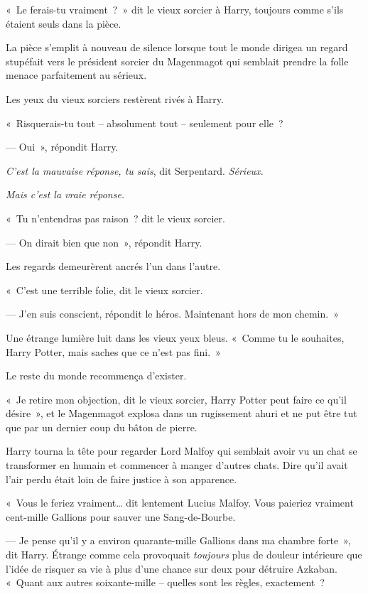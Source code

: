 «~Le ferais-tu vraiment~?~» dit le vieux sorcier à Harry, toujours comme s'ils étaient seuls dans la pièce.

La pièce s'emplit à nouveau de silence lorsque tout le monde dirigea un regard stupéfait vers le président sorcier du Magenmagot qui semblait prendre la folle menace parfaitement au sérieux.

Les yeux du vieux sorciers restèrent rivés à Harry.

«~Risquerais-tu tout -- absolument tout -- seulement pour elle~?

--- Oui~», répondit Harry.

\emph{C'est la mauvaise réponse, tu sais}, dit Serpentard. \emph{Sérieux.}

\emph{Mais c'est la vraie réponse.}

«~Tu n'entendras pas raison~? dit le vieux sorcier.

--- On dirait bien que non~», répondit Harry.

Les regards demeurèrent ancrés l'un dans l'autre.

«~C'est une terrible folie, dit le vieux sorcier.

--- J'en suis conscient, répondit le héros. Maintenant hors de mon chemin.~»

Une étrange lumière luit dans les vieux yeux bleus. «~Comme tu le souhaites, Harry Potter, mais saches que ce n'est pas fini.~»

Le reste du monde recommença d'exister.

«~Je retire mon objection, dit le vieux sorcier, Harry Potter peut faire ce qu'il désire~», et le Magenmagot explosa dans un rugissement ahuri et ne put être tut que par un dernier coup du bâton de pierre.

Harry tourna la tête pour regarder Lord Malfoy qui semblait avoir vu un chat se transformer en humain et commencer à manger d'autres chats. Dire qu'il avait l'air perdu était loin de faire justice à son apparence.

«~Vous le feriez vraiment… dit lentement Lucius Malfoy. Vous paieriez vraiment cent-mille Gallions pour sauver une Sang-de-Bourbe.

--- Je pense qu'il y a environ quarante-mille Gallions dans ma chambre forte~», dit Harry. Étrange comme cela provoquait \emph{toujours} plus de douleur intérieure que l'idée de risquer sa vie à plus d'une chance sur deux pour détruire Azkaban. «~Quant aux autres soixante-mille -- quelles sont les règles, exactement~?

